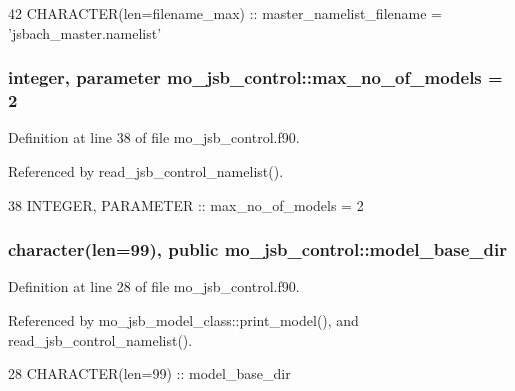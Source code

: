 \begin{DoxyCode}
42   \textcolor{keywordtype}{CHARACTER(len=filename\_max)} :: master\_namelist\_filename = \textcolor{stringliteral}{'jsbach\_master.namelist'}
\end{DoxyCode}
\hypertarget{namespacemo__jsb__control_a8926f94cca1021902c183b3f31c1bb7f}{}
\subsubsection[{max\+\_\+no\+\_\+of\+\_\+models}]{\setlength{\rightskip}{0pt plus 5cm}integer, parameter mo\+\_\+jsb\+\_\+control\+::max\+\_\+no\+\_\+of\+\_\+models = 2}\label{namespacemo__jsb__control_a8926f94cca1021902c183b3f31c1bb7f}


Definition at line 38 of file mo\+\_\+jsb\+\_\+control.\+f90.



Referenced by read\+\_\+jsb\+\_\+control\+\_\+namelist().


\begin{DoxyCode}
38   \textcolor{keywordtype}{INTEGER}, \textcolor{keywordtype}{PARAMETER}    :: max\_no\_of\_models = 2
\end{DoxyCode}
\hypertarget{namespacemo__jsb__control_a7011bd39debd8f5806d4da9947ac38a6}{}
\subsubsection[{model\+\_\+base\+\_\+dir}]{\setlength{\rightskip}{0pt plus 5cm}character(len=99), public mo\+\_\+jsb\+\_\+control\+::model\+\_\+base\+\_\+dir}\label{namespacemo__jsb__control_a7011bd39debd8f5806d4da9947ac38a6}


Definition at line 28 of file mo\+\_\+jsb\+\_\+control.\+f90.



Referenced by mo\+\_\+jsb\+\_\+model\+\_\+class\+::print\+\_\+model(), and read\+\_\+jsb\+\_\+control\+\_\+namelist().


\begin{DoxyCode}
28   \textcolor{keywordtype}{CHARACTER(len=99)} :: model\_base\_dir
\end{DoxyCode}
\hypertarget{namespacemo__jsb__control_aa28a5f0f9a2b85b29e9641a4bc9cd187}{}
